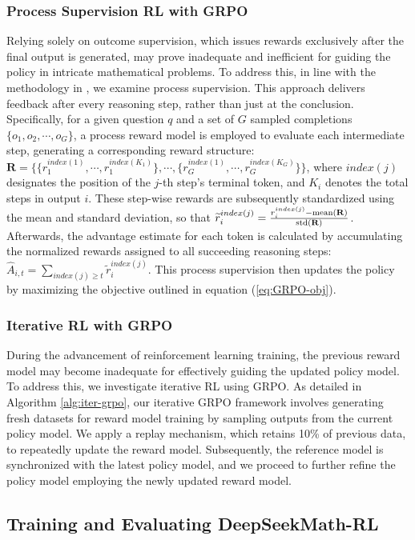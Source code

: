 \begin{itemize}[topsep=0pt]
\begin{itemize}[topsep=0pt]
\subsubsection{Process Supervision RL with GRPO} Relying solely on outcome supervision, which issues rewards exclusively after the final output is generated, may prove inadequate and inefficient for guiding the policy in intricate mathematical problems. To address this, in line with the methodology in \cite{wang2023math}, we examine process supervision. This approach delivers feedback after every reasoning step, rather than just at the conclusion. Specifically, for a given question $q$ and a set of $G$ sampled completions $\{o_1, o_2, \cdots, o_G\}$, a process reward model is employed to evaluate each intermediate step, generating a corresponding reward structure: $\mathbf{R} = \{ \{r_1^{index(1)},\cdots,r_1^{index(K_1)}\}, \cdots,  \{r_G^{index(1)},\cdots,r_G^{index(K_G)}\} \}$, where $index(j)$ designates the position of the $j$-th step’s terminal token, and $K_i$ denotes the total steps in output $i$. These step-wise rewards are subsequently standardized using the mean and standard deviation, so that $\widetilde{r}_i^{index(j)} = \frac{r_i^{index(j)} - {\rm mean(\mathbf{R})}}{{\rm std(\mathbf{R})}}$.
Afterwards, the advantage estimate for each token is calculated by accumulating the normalized rewards assigned to all succeeding reasoning steps: $\hat{A}_{i, t} = \sum_{index(j) \ge t} \widetilde{r}_i^{index(j)}$.
This process supervision then updates the policy by maximizing the objective outlined in equation (\ref{eq:GRPO-obj}).

\subsubsection{Iterative RL with GRPO} During the advancement of reinforcement learning training, the previous reward model may become inadequate for effectively guiding the updated policy model. To address this, we investigate iterative RL using GRPO. As detailed in Algorithm \ref{alg:iter-grpo}, our iterative GRPO framework involves generating fresh datasets for reward model training by sampling outputs from the current policy model. We apply a replay mechanism, which retains 10\% of previous data, to repeatedly update the reward model. Subsequently, the reference model is synchronized with the latest policy model, and we proceed to further refine the policy model employing the newly updated reward model.

\subsection{Training and Evaluating DeepSeekMath-RL}


\end{itemize}
\end{itemize}
